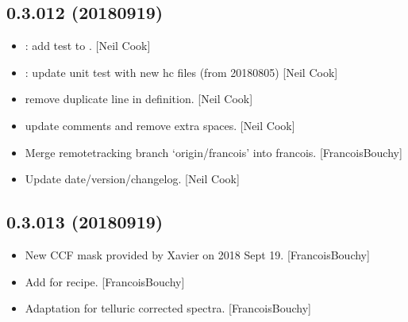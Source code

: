 \documentclass[a4paper,10pt,english]{report}
\begin{document}
\subsection{0.3.012 (2018\sphinxhyphen{}09\sphinxhyphen{}19)}
\label{\detokenize{misc/changelog:id336}}\begin{itemize}
\item {} 
: add  test to . {[}Neil Cook{]}

\item {} 
: update unit test with new hc files (from 2018\sphinxhyphen{}08\sphinxhyphen{}05) {[}Neil
Cook{]}

\item {} 
 \sphinxhyphen{} remove duplicate line in  definition.
{[}Neil Cook{]}

\item {} 
 \sphinxhyphen{} update comments and remove extra spaces.
{[}Neil Cook{]}

\item {} 
Merge remote\sphinxhyphen{}tracking branch ‘origin/francois’ into francois.
{[}FrancoisBouchy{]}

\item {} 
Update date/version/changelog. {[}Neil Cook{]}

\end{itemize}


\subsection{0.3.013 (2018\sphinxhyphen{}09\sphinxhyphen{}19)}
\label{\detokenize{misc/changelog:id337}}\begin{itemize}
\item {} 
New CCF mask provided by Xavier on 2018 Sept 19. {[}FrancoisBouchy{]}

\item {} 
Add  for  recipe. {[}FrancoisBouchy{]}

\item {} 
Adaptation for telluric corrected spectra. {[}FrancoisBouchy{]}

\end{itemize}
\end{document}
